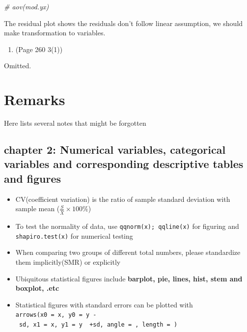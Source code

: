 \documentclass{article}
\newenvironment{Shaded}{\begin{snugshade}}{\end{snugshade}}
\newcommand{\CommentTok}[1]{\textcolor[rgb]{0.56,0.35,0.01}{\textit{#1}}}
\begin{document}
\begin{Shaded}
\begin{Highlighting}[]
\CommentTok{\# aov(mod.yx)}
\end{Highlighting}
\end{Shaded}

The residual plot shows the residuals don't follow linear assumption, we
should make transformation to variables.

\begin{enumerate}
\def\labelenumi{\arabic{enumi}.}
\setcounter{enumi}{1}
\tightlist
\item
  (Page 260 3(1))
\end{enumerate}

Omitted.

\newpage

\hypertarget{remarks}{%
\section{Remarks}\label{remarks}}

Here lists several notes that might be forgotten

\hypertarget{chapter-2-numerical-variables-categorical-variables-and-corresponding-descriptive-tables-and-figures}{%
\subsection{chapter 2: Numerical variables, categorical variables and
corresponding descriptive tables and
figures}\label{chapter-2-numerical-variables-categorical-variables-and-corresponding-descriptive-tables-and-figures}}

\begin{itemize}
\tightlist
\item
  CV(coefficient variation) is the ratio of sample standard deviation
  with sample mean (\(\frac{S}{\bar{X}}\times 100\%\))
\item
  To test the normality of data, use \texttt{qqnorm(x);\ qqline(x)} for
  figuring and \texttt{shapiro.test(x)} for numerical testing
\item
  When comparing two groups of different total numbers, please
  standardize them implicitly(SMR) or explicitly
\item
  Ubiquitous statistical figures include
  \textbf{barplot, pie, lines, hist, stem and boxplot, .etc}
\item
  Statistical figures with standard errors can be plotted with
  \texttt{arrows(x0\ =\ x,\ y0\ =\ y\ -\ sd,\ x1\ =\ x,\ y1\ =\ y\ \ +sd,\ angle\ =\ ,\ length\ =\ )}
\end{itemize}
\end{document}
